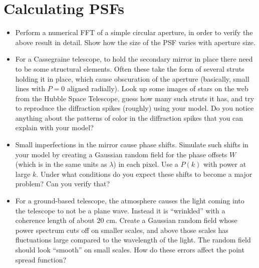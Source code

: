 \documentclass[11pt, preprint]{aastex}
\begin{document}
\section{Calculating PSFs}

\begin{itemize}
\item Perform a numerical FFT of a simple circular aperture, in order
  to verify the above result in detail. Show how the size of the PSF
  varies with aperture size.
\item For a Cassegraine telescope, to hold the secondary mirror in
  place there need to be some structural elements.  Often these take
  the form of several struts holding it in place, which cause
  obscuration of the aperture (basically, small lines with $P=0$
  aligned radially). Look up some images of stars on the web from the
  Hubble Space Telescope, guess how many such struts it has, and try
  to reproduce the diffraction spikes (roughly) using your model. Do
  you notice anything about the patterns of color in the diffraction
  spikes that you can explain with your model?
\item Small imperfections in the mirror cause phase shifts. Simulate
  such shifts in your model by creating a Gaussian random field for
  the phase offsets $W$ (which is in the same units as $\lambda$) in
  each pixel. Use a $P(k)$ with power at large $k$. Under what
  conditions do you expect these shifts to become a major problem? Can
  you verify that?
\item For a ground-based telescope, the atmosphere causes the light
  coming into the telescope to not be a plane wave. Instead it is
  ``wrinkled'' with a coherence length of about 20 cm. Create a
  Gaussian random field whose power spectrum cuts off on smaller
  scales, and above those scales has fluctuations large compared to
  the wavelength of the light. The random field should look ``smooth''
  on small scales.  How do these errors affect the point spread
  function?
\end{itemize}
\end{document}
